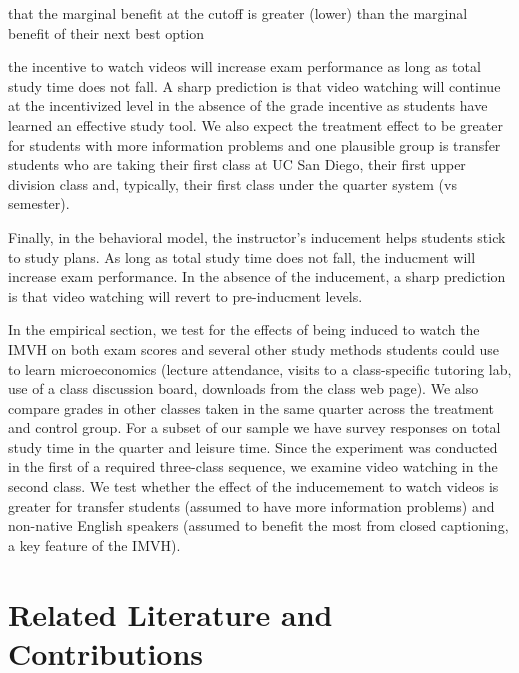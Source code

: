 \documentclass[12pt]{article}
\begin{document}
 that the marginal benefit at the cutoff is greater (lower) than the marginal benefit of their next best option

the incentive to watch videos will increase exam performance as long as total study time does not fall. A sharp prediction is that video watching will continue at the incentivized level in the absence of the grade incentive as students have learned an effective study tool. We also expect the treatment effect to be greater for students with more information problems and one plausible group is transfer students who are taking their first class at UC San Diego, their first upper division class and, typically, their first class under the quarter system (vs semester).

Finally, in the behavioral model, the instructor's inducement helps students stick to study plans. As long as total study time does not fall, the inducment will increase exam performance. In the absence of the inducement, a sharp prediction is that video watching will revert to pre-inducment levels.

In the empirical section, we test for the effects of being induced to watch the IMVH on both exam scores and several other study methods students could use to learn microeconomics (lecture attendance, visits to a class-specific tutoring lab, use of a class discussion board, downloads from the class web page). We also compare grades in other classes taken in the same quarter across the treatment and control group. For a subset of our sample we have survey responses on total study time in the quarter and leisure time. Since the experiment was conducted in the first of a required three-class sequence, we examine video watching in the second class. We test whether the effect of the inducemement to watch videos is greater for transfer students (assumed to have more information problems) and non-native English speakers (assumed to benefit the most from closed captioning, a key feature of the IMVH).

\section{Related Literature and Contributions} \label{background}
\end{document}

